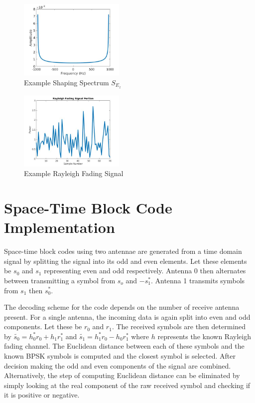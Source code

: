 \documentclass[twocolumn]{article}
\begin{document}
\begin{figure}
    \centering
    \includegraphics[width=0.45\textwidth]{Sez_Plot.jpg}
    \caption{Example Shaping Spectrum $S_{E_z}$}
    \label{fig:my_label}
\end{figure}

\begin{figure}[h]
    \centering
    \includegraphics[width=0.45\textwidth]{Example_Rayleigh.jpg}
    \caption{Example Rayleigh Fading Signal}
    \label{fig:my_label}
\end{figure}

\section{Space-Time Block Code Implementation}

Space-time block codes using two antennae are generated from a time domain signal by splitting the signal into its odd and even elements. Let these elements be $s_0$ and $s_1$ representing even and odd respectively. Antenna 0 then alternates between transmitting a symbol from $s_o$ and $-s_1^*$. Antenna 1 transmits symbols from $s_1$ then $s_0^*$. 

The decoding scheme for the code depends on the number of receive antenna present. For a single antenna, the incoming data is again split into even and odd components. Let these be $r_0$ and $r_1$. The received symbols are then determined by $\tilde{s_0} = h_0^*r_0 + h_1r_1^*$ and  $\tilde{s_1} = h_1^*r_0 - h_0r_1^*$ where $h$ represents the known Rayleigh fading channel. The Euclidean distance between each of these symbols and the known BPSK symbols is computed and the closest symbol is selected. After decision making the odd and even components of the signal are combined. Alternatively, the step of computing Euclidean distance can be eliminated by simply looking at the real component of the raw received symbol and checking if it is positive or negative. 
\end{document}
